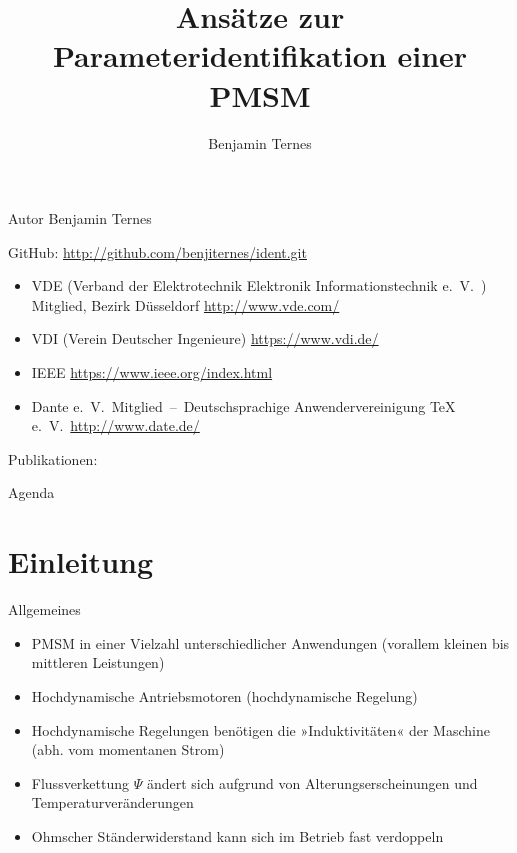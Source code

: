 \documentclass{beamer}
\title[Parameteridentifikation]{Ansätze zur Parameteridentifikation einer PMSM}
\author[Benjamin Ternes]%
{%
Benjamin Ternes
}
\institute{%
Hochschule Bochum\\
Fachbereich Elektrotechnik und Informatik}
\begin{document}
\begin{frame}[plain]
	\titlepage
\end{frame}

\begin{frame}[plain]{Autor}
Benjamin Ternes

GitHub: \url{http://github.com/benjiternes/ident.git}

\begin{itemize}
	\item VDE (Verband der Elektrotechnik Elektronik Informationstechnik e.\ V.\ ) Mitglied, Bezirk Düsseldorf	\url{http://www.vde.com/}
	\item VDI (Verein Deutscher Ingenieure) \url{https://www.vdi.de/}
	\item IEEE \url{https://www.ieee.org/index.html}
	\item Dante e.\ V.\ Mitglied~--~Deutschsprachige Anwendervereinigung TeX e.\ V.\ \url{http://www.date.de/}
\end{itemize}
\vspace{1cm}
Publikationen:\\
\end{frame}

\begin{frame}[plain]{Agenda}
	\tableofcontents
\end{frame}

\section{Einleitung}
\begin{frame}{Allgemeines}
\begin{itemize}
\item PMSM in einer Vielzahl unterschiedlicher Anwendungen (vorallem kleinen bis mittleren Leistungen)
\item Hochdynamische Antriebsmotoren (hochdynamische Regelung)
\item Hochdynamische Regelungen benötigen die »Induktivitäten« der Maschine (abh. vom momentanen Strom)
\item Flussverkettung $\Psi$ ändert sich aufgrund von Alterungserscheinungen und Temperaturveränderungen
\item Ohmscher Ständerwiderstand kann sich im Betrieb fast verdoppeln
\end{itemize}
\end{frame}
\end{document}
